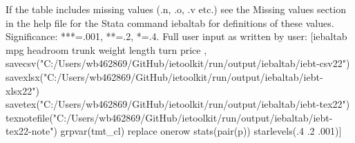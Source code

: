 If the table includes missing values (.n, .o, .v etc.) see the Missing values section in the help file for the Stata command iebaltab for definitions of these values. Significance: ***=.001, **=.2, *=.4. Full user input as written by user: [iebaltab mpg headroom trunk weight length turn price , savecsv("C:/Users/wb462869/GitHub/ietoolkit/run/output/iebaltab/iebt-csv22") savexlsx("C:/Users/wb462869/GitHub/ietoolkit/run/output/iebaltab/iebt-xlsx22") savetex("C:/Users/wb462869/GitHub/ietoolkit/run/output/iebaltab/iebt-tex22") texnotefile("C:/Users/wb462869/GitHub/ietoolkit/run/output/iebaltab/iebt-tex22-note") grpvar(tmt\_cl) replace onerow stats(pair(p)) starlevels(.4 .2 .001)]
